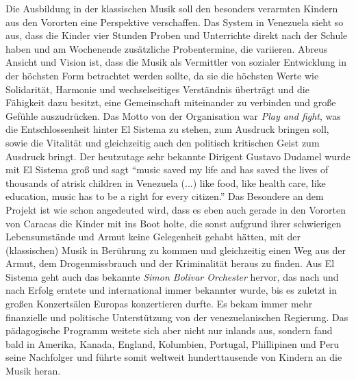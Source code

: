 Die Ausbildung in der klassischen Musik soll den besonders verarmten Kindern aus
den Vororten eine Perspektive verschaffen. Das System in Venezuela sieht so aus,
dass die Kinder vier Stunden Proben und Unterrichte direkt nach der Schule haben
und am Wochenende zusätzliche Probentermine, die variieren. Abreus Ansicht und
Vision ist, dass die Musik als Vermittler von sozialer Entwicklung in der
höchsten Form betrachtet werden sollte, da sie die höchsten Werte wie
Solidarität, Harmonie und wechselseitiges Verständnis überträgt und die
Fähigkeit dazu besitzt, eine Gemeinschaft miteinander zu verbinden und große
Gefühle auszudrücken. Das Motto von der Organisation war \emph{Play and fight},
was die Entschlossenheit hinter El Sistema zu stehen, zum Ausdruck bringen soll,
sowie die Vitalität und gleichzeitig auch den politisch kritischen Geist zum
Ausdruck bringt. Der heutzutage sehr bekannte Dirigent Gustavo Dudamel wurde mit
El Sistema groß und sagt \enquote{music saved my life and has saved the lives of
thousands of atrisk children in Venezuela (...) like food, like health care, like
education, music has to be a right for every
citizen.}\autocite{wikipedia:el_sistema} Das Besondere an dem Projekt ist wie
schon angedeuted wird, dass es eben auch gerade in den Vororten von Caracas die
Kinder mit ins Boot holte, die sonst aufgrund ihrer schwierigen Lebensumstände
und Armut keine Gelegenheit gehabt hätten, mit der (klassischen) Musik in
Berührung zu kommen und gleichzeitig einen Weg aus der Armut, dem
Drogenmissbrauch und der Kriminalität heraus zu finden. Aus El Sistema geht auch
das bekannte \emph{Simon Bolivar Orchester} hervor, das nach und nach Erfolg erntete
und international immer bekannter wurde, bis es zuletzt in großen Konzertsälen
Europas konzertieren durfte. Es bekam immer mehr finanzielle und politische
Unterstützung von der venezuelanischen Regierung. Das pädagogische Programm
weitete sich aber nicht nur inlands aus, sondern fand bald in Amerika, Kanada,
England, Kolumbien, Portugal, Phillipinen und Peru seine Nachfolger und führte
somit weltweit hunderttausende von Kindern an die Musik heran. 

